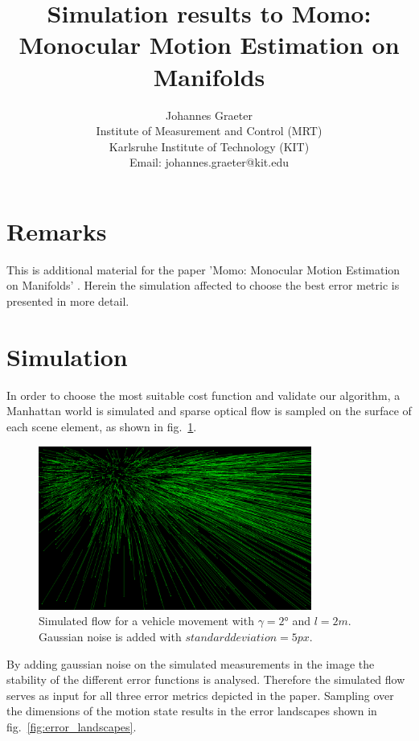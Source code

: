 \documentclass[a4paper]{article}
\begin{document}
\title{Simulation results to Momo: Monocular Motion Estimation on Manifolds}
\author{Johannes Graeter\\
Institute of  Measurement and Control (MRT)\\
Karlsruhe Institute of Technology (KIT)\\
Email: johannes.graeter@kit.edu
}

\maketitle
\section{Remarks}
This is additional material for the paper 'Momo: Monocular Motion Estimation on Manifolds' .
Herein the simulation affected to choose the best error metric is presented in more detail.

\section{Simulation}
In order to choose the most suitable cost function and validate our algorithm, a Manhattan world is simulated and sparse optical flow is sampled on the surface of each scene element, as shown in fig.~\ref{fig:flow_simulation}.

\begin{figure}[htb]
\centering
\includegraphics[width=0.8\textwidth]{flow_simulation}
\caption{Simulated flow for a vehicle movement with $\gamma=2°$ and $l=2m$. Gaussian noise is added with $standard deviation=5px$.}
\label{fig:flow_simulation}
\end{figure}

By adding gaussian noise on the simulated measurements in the image the stability of the different error functions is analysed.
Therefore the simulated flow serves as input for all three error metrics depicted in the paper.
Sampling over the dimensions of the motion state results in the error landscapes shown in fig.~\ref{fig:error_landscapes}.
\end{document}
